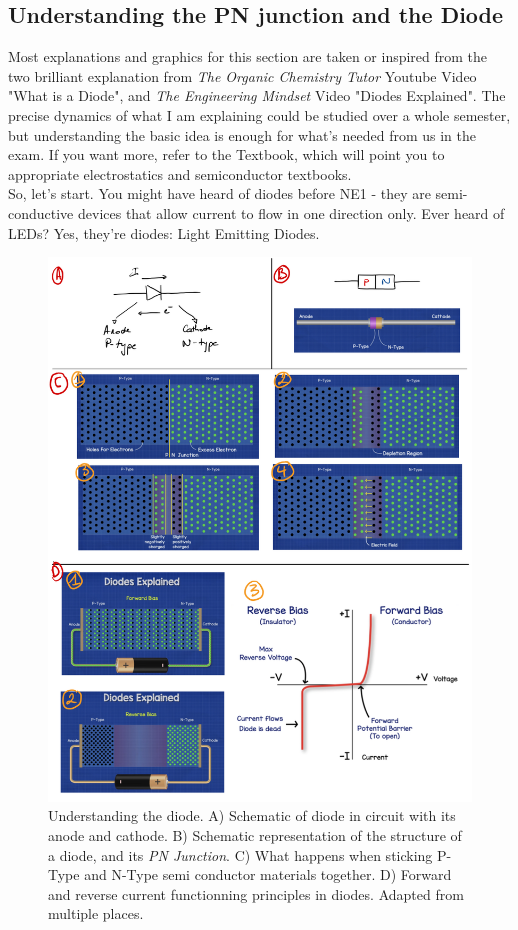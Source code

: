 \subsection{Understanding the PN junction and the Diode}\label{sec:pn_junction_diode}

Most explanations and graphics for this section are taken or inspired from the two brilliant explanation from \emph{The Organic Chemistry Tutor} Youtube Video "What is a Diode", and \emph{The Engineering Mindset} Video "Diodes Explained". The precise dynamics of what I am explaining could be studied over a whole semester, but understanding the basic idea is enough for what's needed from us in the exam. If you want more, refer to the Textbook, which will point you to appropriate electrostatics and semiconductor textbooks. \\

So, let's start. You might have heard of diodes before NE1 - they are semi-conductive devices that allow current to flow in one direction only. Ever heard of LEDs? Yes, they're diodes: Light Emitting Diodes. 

\begin{figure}[H]
    \centering
    \includegraphics[width=1\linewidth]{../../Figures/Diode.png}
    \caption{Understanding the diode. A) Schematic of diode in circuit with its anode and cathode. B) Schematic representation of the structure of a diode, and its \textit{PN Junction}. C) What happens when sticking P-Type and N-Type semi conductor materials together. D) Forward and reverse current functionning principles in diodes. Adapted from multiple places.}
    \label{fig:diode}
\end{figure}

